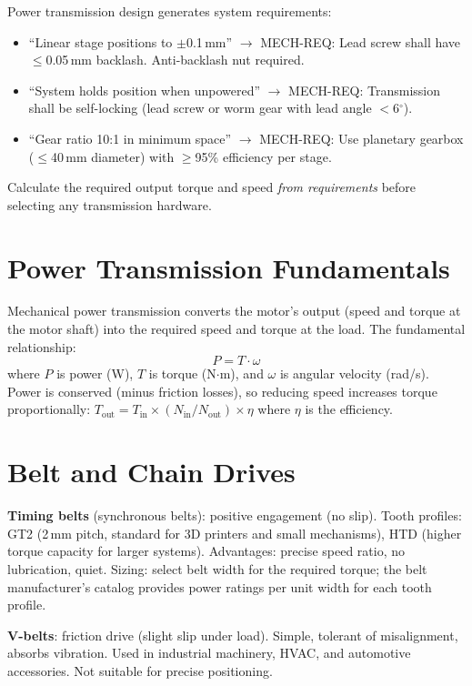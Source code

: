 \documentclass[11pt,letterpaper,twoside,openany]{book}
\providecommand{\ang}[1]{#1\ensuremath{{}^{\circ}}}
\begin{document}
\begin{keyconceptbox}
Power transmission design generates system requirements:
\begin{itemize}[nosep,leftmargin=1.5em]
\item ``Linear stage positions to $\pm$0.1\,mm'' $\to$ MECH-REQ: Lead screw shall have $\leq$0.05\,mm backlash. Anti-backlash nut required.
\item ``System holds position when unpowered'' $\to$ MECH-REQ: Transmission shall be self-locking (lead screw or worm gear with lead angle $<$\ang{6}).
\item ``Gear ratio 10:1 in minimum space'' $\to$ MECH-REQ: Use planetary gearbox ($\leq$40\,mm diameter) with $\geq$95\% efficiency per stage.
\end{itemize}
Calculate the required output torque and speed \emph{from requirements} before selecting any transmission hardware.
\end{keyconceptbox}

\section{Power Transmission Fundamentals}
Mechanical power transmission converts the motor's output (speed and torque at the motor shaft) into the required speed and torque at the load. The fundamental relationship:
\begin{equation}
P = T \cdot \omega
\end{equation}
where $P$ is power (W), $T$ is torque (N$\cdot$m), and $\omega$ is angular velocity (rad/s). Power is conserved (minus friction losses), so reducing speed increases torque proportionally: $T_{\text{out}} = T_{\text{in}} \times (N_{\text{in}}/N_{\text{out}}) \times \eta$ where $\eta$ is the efficiency.

\section{Belt and Chain Drives}
\textbf{Timing belts} (synchronous belts): positive engagement (no slip). Tooth profiles: GT2 (2\,mm pitch, standard for 3D printers and small mechanisms), HTD (higher torque capacity for larger systems). Advantages: precise speed ratio, no lubrication, quiet. Sizing: select belt width for the required torque; the belt manufacturer's catalog provides power ratings per unit width for each tooth profile.

\textbf{V-belts}: friction drive (slight slip under load). Simple, tolerant of misalignment, absorbs vibration. Used in industrial machinery, HVAC, and automotive accessories. Not suitable for precise positioning.
\end{document}
